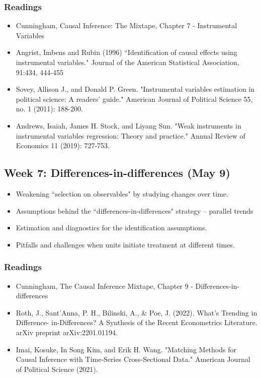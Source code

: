 \documentclass[11pt, article, oneside]{memoir}
\theoremstyle{Assumption}
\begin{document}
\subsubsection*{Readings}

\begin{itemize}
\item Cunningham, Causal Inference: The Mixtape, Chapter 7 - Instrumental Variables
\item Angrist, Imbens and Rubin (1996) ``Identification of causal effects using instrumental variables." Journal of the American Statistical Association, 91:434, 444-455
\item Sovey, Allison J., and Donald P. Green. "Instrumental variables estimation in political science: A readers’ guide." American Journal of Political Science 55, no. 1 (2011): 188-200.
\item Andrews, Isaiah, James H. Stock, and Liyang Sun. "Weak instruments in instrumental variables regression: Theory and practice." Annual Review of Economics 11 (2019): 727-753.
\end{itemize}


\subsection{Week 7: Differences-in-differences (May 9)}

\begin{itemize}
\item Weakening ``selection on observables" by studying changes over time. 
\item Assumptions behind the ``differences-in-differences" strategy -- parallel trends
\item Estimation and diagnostics for the identification assumptions.
\item Pitfalls and challenges when units initiate treatment at different times. 
\end{itemize}

\subsubsection*{Readings}

\begin{itemize}
\item Cunningham, The Causal Inference Mixtape, Chapter 9 - Differences-in-differences
\item Roth, J., Sant'Anna, P. H., Bilinski, A., \& Poe, J. (2022). What's Trending in Difference- in-Differences? A Synthesis of the Recent Econometrics Literature. arXiv preprint arXiv:2201.01194.
\item Imai, Kosuke, In Song Kim, and Erik H. Wang. "Matching Methods for Causal Inference with Time‐Series Cross‐Sectional Data." American Journal of Political Science (2021).
\end{itemize}
\end{document}
